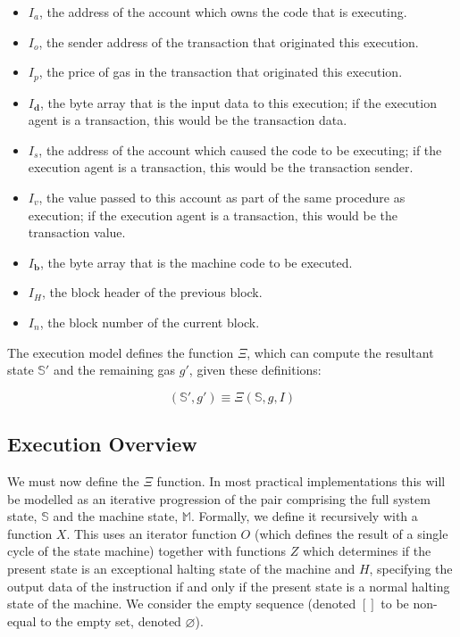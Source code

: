 \documentclass[9pt,oneside]{amsart}
\begin{document}
\begin{multicols}{2}
\begin{itemize}
\item $I_a$, the address of the account which owns the code that is executing.
\item $I_o$, the sender address of the transaction that originated this execution.
\item $I_p$, the price of gas in the transaction that originated this execution.
\item $I_\mathbf{d}$, the byte array that is the input data to this execution; if the execution agent is a transaction, this would be the transaction data.
\item $I_s$, the address of the account which caused the code to be executing; if the execution agent is a transaction, this would be the transaction sender.
\item $I_v$, the value passed to this account as part of the same procedure as execution; if the execution agent is a transaction, this would be the transaction value.
\item $I_\mathbf{b}$, the byte array that is the machine code to be executed.
\item $I_H$, the block header of the previous block.
\item $I_n$, the block number of the current block.
\end{itemize}

The execution model defines the function $\Xi$, which can compute the resultant state $\mathbb{S}'$ and the remaining gas $g'$, given these definitions:

\begin{equation}
(\mathbb{S}', g') \equiv \Xi(\mathbb{S}, g, I)
\end{equation}

\subsection{Execution Overview}

We must now define the $\Xi$ function. In most practical implementations this will be modelled as an iterative progression of the pair comprising the full system state, $\mathbb{S}$ and the machine state, $\mathbb{M}$. Formally, we define it recursively with a function $X$. This uses an iterator function $O$ (which defines the result of a single cycle of the state machine) together with functions $Z$ which determines if the present state is an exceptional halting state of the machine and $H$, specifying the output data of the instruction if and only if the present state is a normal halting state of the machine. We consider the empty sequence (denoted $[]$ to be non-equal to the empty set, denoted $\varnothing$).


\end{multicols}
\end{document}

